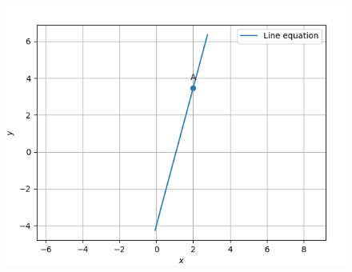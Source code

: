 \documentclass[12pt]{article}
\begin{document}
\begin{enumerate}
\begin{figure}[!h]
	\begin{center} 
	    \includegraphics[width=\columnwidth]{./figs/line.png}
	\end{center}
\caption{}
\label{fig:Fig}
\end{figure}
\end{enumerate}
\end{document}
